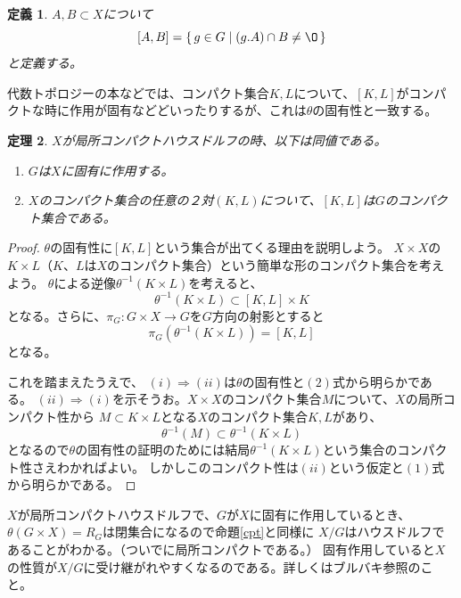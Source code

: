 \documentclass[leqno]{jsarticle}
\newtheorem{thm}{定理}
\newtheorem{df}[thm]{定義}
\newcommand{\To}{\Longrightarrow}
\renewcommand{\labelenumi}{{\rm (\arabic{enumi})}}
\begin{document}
\begin{df}
$A, B\subset X$について
\[
[A,B]=\{\,g\in G\mid (g.A)\cap B\neq \O \,\}
\]
と定義する。
\end{df}
代数トポロジーの本などでは、コンパクト集合$K,L$について、$[K,L]$がコンパクトな時に作用が固有などどいったりするが、これは$\theta$の固有性と一致する。
\begin{thm}
$X$が局所コンパクトハウスドルフの時、以下は同値である。
\renewcommand{\labelenumi}{\normalfont(\roman{enumi}).}
\begin{enumerate}
\item $G$は$X$に固有に作用する。
\item $X$のコンパクト集合の任意の２対$(K,L)$について、$[K,L]$は$G$のコンパクト集合である。
\end{enumerate}
\end{thm}
\begin{proof}
\setcounter{equation}{0}
$\theta$の固有性に$[K,L]$という集合が出てくる理由を説明しよう。
$X\times X$の$K\times L$（$K$、$L$は$X$のコンパクト集合）という簡単な形のコンパクト集合を考えよう。
$\theta$による逆像$\theta^{-1}(K\times L)$を考えると、
\begin{equation}
\theta^{-1}(K\times L)\subset [K,L]\times K
\end{equation}
となる。さらに、$\pi_G:G\times X\to G$を$G$方向の射影とすると
\begin{equation}
\pi_G(\theta^{-1}(K\times L))=[K,L]
\end{equation}
となる。
\par
これを踏まえたうえで、
$(i)\To (ii)$は$\theta$の固有性と$(2)$式から明らかである。
$(ii)\To (i)$を示そうお。$X\times X$のコンパクト集合$M$について、$X$の局所コンパクト性から
$M\subset K\times L$となる$X$のコンパクト集合$K,L$があり、
\[
\theta^{-1}(M)\subset \theta^{-1}(K\times L)
\]
となるので$\theta$の固有性の証明のためには結局$\theta^{-1}(K\times L)$という集合のコンパクト性さえわかればよい。
しかしこのコンパクト性は$(ii)$という仮定と$(1)$式から明らかである。
\end{proof}
$X$が局所コンパクトハウスドルフで、$G$が$X$に固有に作用しているとき、
$\theta(G\times X)=R_G$は閉集合になるので命題\ref{cpt}と同様に
$X/G$はハウスドルフであることがわかる。（ついでに局所コンパクトである。）
固有作用していると$X$の性質が$X/G$に受け継がれやすくなるのである。詳しくはブルバキ参照のこと。
\end{document}
